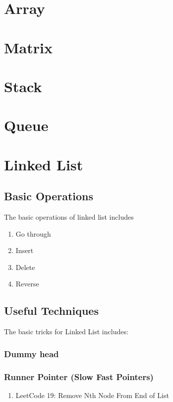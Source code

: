 \chapter{ Array }

\chapter{ Matrix }

\chapter{ Stack }

\chapter{ Queue }

\chapter{ Linked List }

\section{ Basic Operations  }
The basic operations of linked list includes 
\begin{enumerate}
    \item Go through

    \item Insert

    \item Delete
    
    \item Reverse

\end{enumerate}

\section{ Useful Techniques  }
The basic tricks for Linked List includes:
 
\subsection { Dummy head }


\subsection { Runner Pointer (Slow Fast Pointers)}
\begin{enumerate}
    \item LeetCode 19: Remove Nth Node From End of List


\end{enumerate}
   


